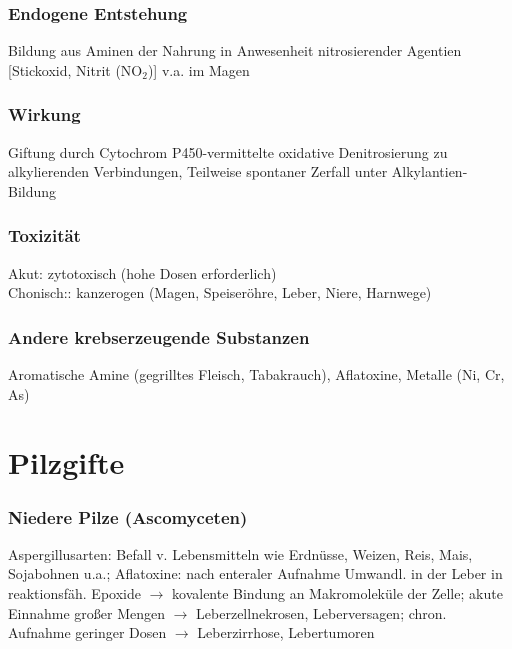 \documentclass[10pt,a4paper]{report}
\begin{document}
\subsubsection{Endogene Entstehung} %
\label{ssub:endogene_entstehung}
Bildung aus Aminen der Nahrung in Anwesenheit nitrosierender Agentien [Stickoxid, Nitrit (NO$_2$)] v.a. im Magen
\subsubsection{Wirkung} %
\label{ssub:wirkung}
Giftung durch Cytochrom P450-vermittelte oxidative Denitrosierung zu alkylierenden Verbindungen, Teilweise spontaner Zerfall unter Alkylantien-Bildung 
\subsubsection{Toxizität} %
\label{ssub:akute_toxizit_t}
Akut: zytotoxisch (hohe Dosen erforderlich)\\
Chonisch:: kanzerogen (Magen, Speiseröhre, Leber, Niere, Harnwege)
\subsubsection{Andere krebserzeugende Substanzen} %
\label{ssub:andere_krebserzeugende_substanzen_aromatische_amine_gegrilltes_fleisch_tabakrauch_aflatoxine_metalle_ni_cr_as_}
Aromatische Amine (gegrilltes Fleisch, Tabakrauch), Aflatoxine, Metalle (Ni, Cr, As)
\section{Pilzgifte} %
\label{sec:pilzgifte}
\subsubsection{Niedere Pilze (Ascomyceten)} %
\label{ssub:niedere_pilze_ascomyceten_}
Aspergillusarten: Befall v. Lebensmitteln wie Erdnüsse, Weizen, Reis, Mais, Sojabohnen u.a.; Aflatoxine: nach enteraler Aufnahme Umwandl. in der Leber in reaktionsfäh. Epoxide $\rightarrow$ kovalente Bindung an Makromoleküle der Zelle; akute Einnahme großer Mengen $\rightarrow$ Leberzellnekrosen, Leberversagen; chron. Aufnahme geringer Dosen $\rightarrow$ Leberzirrhose, Lebertumoren
\end{document}
